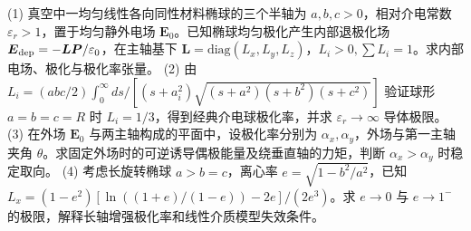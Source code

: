 (1) 真空中一均匀线性各向同性材料椭球的三个半轴为 \(a,b,c>0\)，相对介电常数 \(\varepsilon_r>1\)，置于均匀静外电场 \(\boldsymbol E_0\)。已知椭球均匀极化产生内部退极化场 \(\boldsymbol E_{\rm dep}=-\boldsymbol L\boldsymbol P/\varepsilon_0\)，在主轴基下 \(\boldsymbol L=\mathrm{diag}(L_x,L_y,L_z)\)，\(L_i>0,\sum L_i=1\)。求内部电场、极化与极化率张量。
(2) 由 \(L_i=(abc/2)\int_0^\infty ds/[(s+a_i^2)\sqrt{(s+a^2)(s+b^2)(s+c^2)}]\) 验证球形 \(a=b=c=R\) 时 \(L_i=1/3\)，得到经典介电球极化率，并求 \(\varepsilon_r\to\infty\) 导体极限。
(3) 在外场 \(\boldsymbol E_0\) 与两主轴构成的平面中，设极化率分别为 \(\alpha_x,\alpha_y\)，外场与第一主轴夹角 \(\theta\)。求固定外场时的可逆诱导偶极能量及绕垂直轴的力矩，判断 \(\alpha_x>\alpha_y\) 时稳定取向。
(4) 考虑长旋转椭球 \(a>b=c\)，离心率 \(e=\sqrt{1-b^2/a^2}\)，已知 \(L_x=(1-e^2)[\ln((1+e)/(1-e))-2e]/(2e^3)\)。求 \(e\to0\) 与 \(e\to1^-\) 的极限，解释长轴增强极化率和线性介质模型失效条件。
